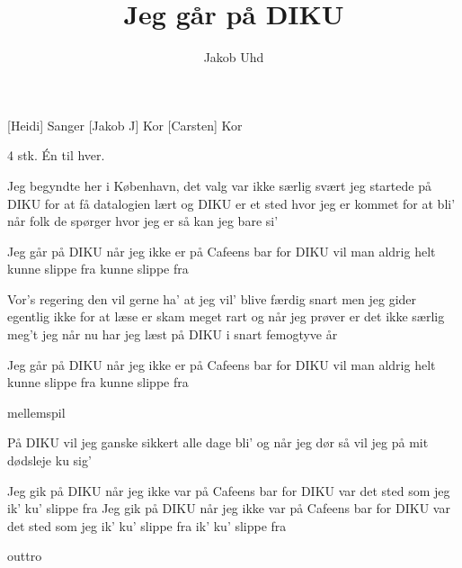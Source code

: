\documentclass[a4paper,11pt]{article}
\title{Jeg går på DIKU}
\author{Jakob Uhd}
\begin{document}
\maketitle

\begin{roles}
[Heidi] Sanger
[Jakob J] Kor
[Carsten] Kor
\end{roles}

\begin{props}
   4 stk. \'En til hver.
\end{props}

\begin{song}

Jeg begyndte her i København, det valg var ikke særlig svært
jeg startede på DIKU for at få datalogien lært
og DIKU er et sted hvor jeg er kommet for at bli'
når folk de spørger hvor jeg er så kan jeg bare si'

Jeg går på DIKU når jeg ikke er
på Cafeens bar
for DIKU vil man aldrig helt
kunne slippe fra
kunne slippe fra

Vor's regering den vil gerne ha' at jeg vil' blive færdig snart
men jeg gider egentlig ikke for at læse er skam meget rart
og når jeg prøver er det ikke særlig meg't jeg når
nu har jeg læst på DIKU i snart femogtyve år

Jeg går på DIKU når jeg ikke er
på Cafeens bar
for DIKU vil man aldrig helt
kunne slippe fra
kunne slippe fra

\scene mellemspil

På DIKU vil jeg ganske sikkert alle dage bli'
og når jeg dør så vil jeg på mit dødsleje ku sig'

Jeg gik på DIKU når jeg ikke var
på Cafeens bar
for DIKU var det sted som jeg
ik' ku' slippe fra
Jeg gik på DIKU når jeg ikke var
på Cafeens bar
for DIKU var det sted som jeg
ik' ku' slippe fra
ik' ku' slippe fra

\scene outtro

\end{song}
\end{document}
